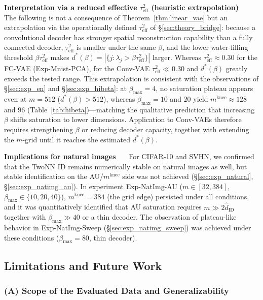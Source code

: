 \documentclass[make,article,submit,pdftex,moreauthors]{Definitions/mdpi}
\newcommand{\mknee}{m^{\mathrm{knee}}}
\begin{document}
\textbf{Interpretation via a reduced effective $\tau^2_\mathrm{eff}$ (heuristic
extrapolation)}~~~
The following is not a consequence of Theorem~\ref{thm:linear_vae} but an
extrapolation via the operationally defined $\tau^2_\mathrm{eff}$ of
\S\ref{sec:theory_bridge}:
because a convolutional decoder has stronger spatial reconstruction capability than a
fully connected decoder, $\tau^2_\mathrm{eff}$ is smaller under the same $\beta$, and
the lower water-filling threshold $\beta\tau^2_\mathrm{eff}$ makes
$d^*(\beta) = |\{j : \lambda_j > \beta\tau^2_\mathrm{eff}\}|$ larger.
Whereas $\tau^2_\mathrm{eff} \approx 0.30$ for the FC-VAE (Exp-Mnist-PCA), for the
Conv-VAE $\tau^2_\mathrm{eff} \ll 0.30$ and $d^*(\beta)$ greatly exceeds the tested
range.
This extrapolation is consistent with the observations of \S\ref{sec:exp_en} and
\S\ref{sec:exp_hibeta}: at $\beta_{\max}=4$, no saturation plateau appears even at
$m=512$ ($d^*(\beta) > 512$), whereas $\beta_{\max}=10$ and $20$ yield
$\mknee \approx 128$ and $96$ (Table~\ref{tab:hibeta})---matching the qualitative
prediction that increasing $\beta$ shifts saturation to lower dimensions.
Application to Conv-VAEs therefore requires strengthening $\beta$ or reducing decoder
capacity, together with extending the $m$-grid until it reaches the estimated
$d^*(\beta)$.


\textbf{Implications for natural images}~~~
For CIFAR-10 and SVHN, we confirmed that the TwoNN ID remains numerically stable on
natural images as well, but stable identification on the AU/$\mknee$ side was not
achieved (\S\ref{sec:exp_natural}, \S\ref{sec:exp_natimg_au}).
In experiment Exp-NatImg-AU ($m \in [32, 384]$, $\beta_{\max} \in \{10,20,40\}$),
$\mknee = 384$ (the grid edge) persisted under all conditions, and it was quantitatively
identified that AU saturation requires $m \gg 2\hat{d}_\mathrm{ID}$ together with
$\beta_{\max} \gg 40$ or a thin decoder.
The observation of plateau-like behavior in Exp-NatImg-Sweep
(\S\ref{sec:exp_natimg_sweep}) was achieved under these conditions
($\beta_{\max}=80$, thin decoder).

\subsection{Limitations and Future Work}\label{sec:disc_limitation}

\subsubsection*{(A) Scope of the Evaluated Data and Generalizability}
\end{document}
